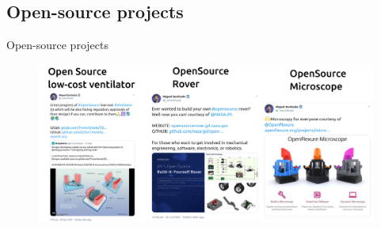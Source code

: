 \subsection{Open-source projects}
{
\begin{frame}{Open-source projects}
    \vspace{-00mm}
      \begin{figure}
        \centering
        \includegraphics[width=\linewidth]{./figs/oa-projects/versions/drawing-v00.png}
        \caption{}
      \end{figure}
\end{frame}
}

